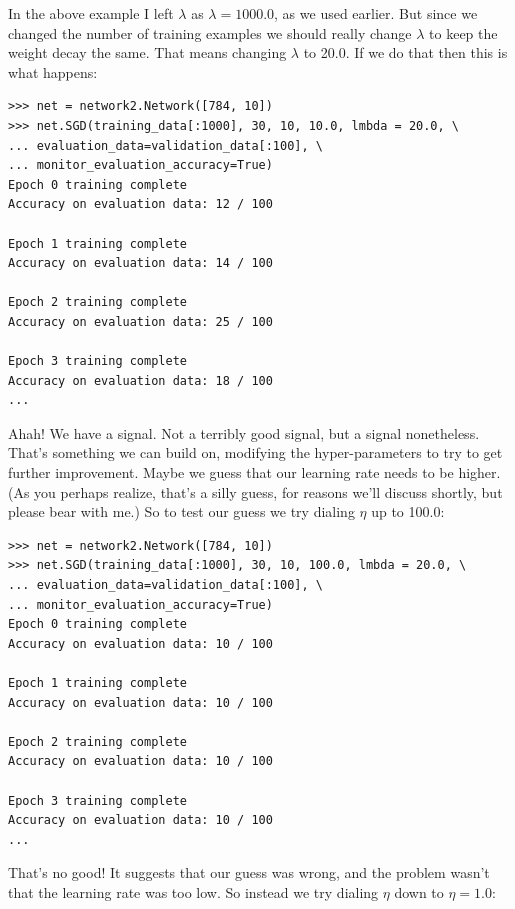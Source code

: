 \documentclass[a4paper,twoside,10pt]{book}
\begin{document}
In the above example I left $\lambda$ as $\lambda=1000.0$, as we used earlier. But since we changed the number of training examples we should really change $\lambda$ to keep the weight decay the same. That means changing $\lambda$ to 20.0. If we do that then this is what happens:
\begin{lstlisting}
>>> net = network2.Network([784, 10])
>>> net.SGD(training_data[:1000], 30, 10, 10.0, lmbda = 20.0, \
... evaluation_data=validation_data[:100], \
... monitor_evaluation_accuracy=True)
Epoch 0 training complete
Accuracy on evaluation data: 12 / 100

Epoch 1 training complete
Accuracy on evaluation data: 14 / 100

Epoch 2 training complete
Accuracy on evaluation data: 25 / 100

Epoch 3 training complete
Accuracy on evaluation data: 18 / 100
...
\end{lstlisting}
Ahah! We have a signal. Not a terribly good signal, but a signal nonetheless. That's something we can build on, modifying the hyper-parameters to try to get further improvement. Maybe we guess that our learning rate needs to be higher. (As you perhaps realize, that's a silly guess, for reasons we'll discuss shortly, but please bear with me.) So to test our guess we try dialing $\eta$ up to 100.0:

\begin{lstlisting}
>>> net = network2.Network([784, 10])
>>> net.SGD(training_data[:1000], 30, 10, 100.0, lmbda = 20.0, \
... evaluation_data=validation_data[:100], \
... monitor_evaluation_accuracy=True)
Epoch 0 training complete
Accuracy on evaluation data: 10 / 100

Epoch 1 training complete
Accuracy on evaluation data: 10 / 100

Epoch 2 training complete
Accuracy on evaluation data: 10 / 100

Epoch 3 training complete
Accuracy on evaluation data: 10 / 100
...
\end{lstlisting}
That's no good! It suggests that our guess was wrong, and the problem wasn't that the learning rate was too low. So instead we try dialing $\eta$ down to $\eta=1.0$:
\end{document}
